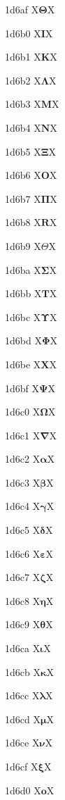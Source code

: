 \documentclass[11pt]{article}
\begin{document}
1d6af X{\ensuremath{\mathbf{\Theta}}}X

1d6b0 X{\ensuremath{\mathbf{I}}}X

1d6b1 X{\ensuremath{\mathbf{K}}}X

1d6b2 X{\ensuremath{\mathbf{\Lambda}}}X

1d6b3 X{\ensuremath{\mathbf{M}}}X

1d6b4 X{\ensuremath{\mathbf{N}}}X

1d6b5 X{\ensuremath{\mathbf{\Xi}}}X

1d6b6 X{\ensuremath{\mathbf{O}}}X

1d6b7 X{\ensuremath{\mathbf{\Pi}}}X

1d6b8 X{\ensuremath{\mathbf{R}}}X

1d6b9 X{\ensuremath{\mathbf{\varTheta}}}X

1d6ba X{\ensuremath{\mathbf{\Sigma}}}X

1d6bb X{\ensuremath{\mathbf{T}}}X

1d6bc X{\ensuremath{\mathbf{\Upsilon}}}X

1d6bd X{\ensuremath{\mathbf{\Phi}}}X

1d6be X{\ensuremath{\mathbf{X}}}X

1d6bf X{\ensuremath{\mathbf{\Psi}}}X

1d6c0 X{\ensuremath{\mathbf{\Omega}}}X

1d6c1 X{\ensuremath{\mathbf{\nabla}}}X

1d6c2 X{\ensuremath{\mathbf{\alpha}}}X

1d6c3 X{\ensuremath{\mathbf{\beta}}}X

1d6c4 X{\ensuremath{\mathbf{\gamma}}}X

1d6c5 X{\ensuremath{\mathbf{\delta}}}X

1d6c6 X{\ensuremath{\mathbf{\varepsilon}}}X

1d6c7 X{\ensuremath{\mathbf{\zeta}}}X

1d6c8 X{\ensuremath{\mathbf{\eta}}}X

1d6c9 X{\ensuremath{\mathbf{\theta}}}X

1d6ca X{\ensuremath{\mathbf{\iota}}}X

1d6cb X{\ensuremath{\mathbf{\kappa}}}X

1d6cc X{\ensuremath{\mathbf{\lambda}}}X

1d6cd X{\ensuremath{\mathbf{\mu}}}X

1d6ce X{\ensuremath{\mathbf{\nu}}}X

1d6cf X{\ensuremath{\mathbf{\xi}}}X

1d6d0 X{\ensuremath{\mathbf{o}}}X
\end{document}
